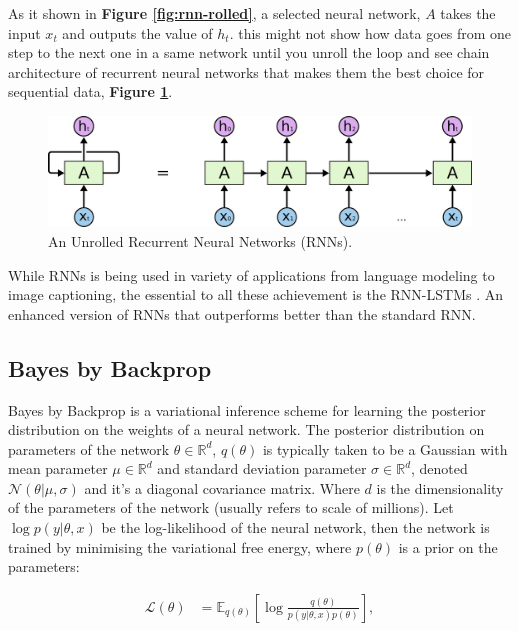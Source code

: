 As it shown in \textbf{Figure \ref{fig:rnn-rolled}}, a selected neural network, $A$ takes the input $x_t$ and outputs the value of $h_t$. this might not show how data goes from one step to the next one in a same network until you unroll the loop and see chain architecture of recurrent neural networks that makes them the best choice for sequential data, \textbf{Figure \ref{fig:rnn-unrolled}}.

\begin{figure}[p]
	\centering
	\includegraphics[scale=0.4]{./figs/rnn-unrolled}
	\caption[An Unrolled Recurrent Neural Networks]{An Unrolled Recurrent Neural Networks (RNNs).}
	\label{fig:rnn-unrolled}
\end{figure}

While RNNs is being used in variety of applications from language modeling to image captioning, the essential to all these achievement is the RNN-LSTMs \cite{Hochreiter1997}. An enhanced version of RNNs that outperforms better than the standard RNN.

\subsection{Bayes by Backprop}

Bayes by Backprop \cite{Blundell2015a} is a variational inference scheme for learning the posterior distribution on the weights of a neural network.
The posterior distribution on parameters of the network $\theta \in \mathbb{R}^d$, $q(\theta)$ is typically taken to be a Gaussian with mean parameter $\mu\in \mathbb{R}^d$ and standard deviation parameter $\sigma\in \mathbb{R}^d$, denoted $\mathcal{N}(\theta|\mu,\sigma)$ and it's a diagonal covariance matrix. Where $d$ is the dimensionality of the parameters of the network (usually refers to scale of millions).
Let $\log p(y|\theta, x)$ be the log-likelihood of the neural network, then the network is trained by minimising the variational free energy, where $p(\theta)$ is a prior on the parameters:

\begin{align}
	\label{eq:elbo}
	\mathcal{L}(\theta) &=
	\mathbb{E}_{q(\theta)}\left[\log \frac{q(\theta)}{p(y|\theta, x)p(\theta)}\right],
\end{align}

